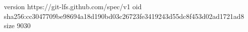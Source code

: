 version https://git-lfs.github.com/spec/v1
oid sha256:cc3047709be98694a18d190bd03c26723fe3419243d55dc8f453d02ad1721ad8
size 9030
